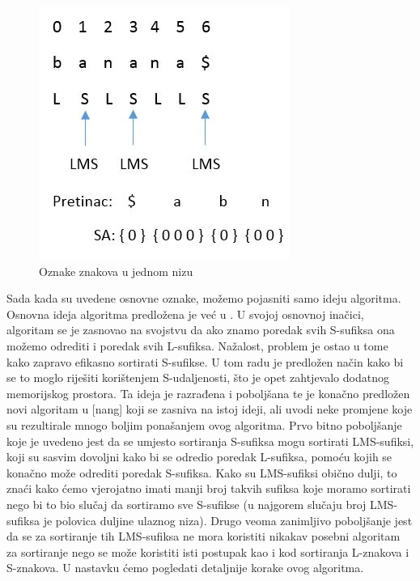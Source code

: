 \begin{figure}[h]
   \centering
       \includegraphics{./pictures/charactertypes.jpg}
 \caption{Oznake znakova u jednom nizu}
 \label{fig:oznake}
\end{figure}

Sada kada su uvedene osnovne oznake, možemo pojasniti samo ideju algoritma. Osnovna ideja algoritma predložena je već u \cite{ka}. U svojoj osnovnoj inačici, algoritam se je zasnovao na svojstvu da ako znamo poredak svih S-sufiksa ona možemo odrediti i poredak svih L-sufiksa. Nažalost, problem je ostao u tome kako zapravo efikasno sortirati S-sufikse. U tom radu je predložen način kako bi se to moglo riješiti korištenjem S-udaljenosti, što je opet zahtjevalo dodatnog memorijskog prostora. Ta ideja je razrađena i poboljšana te je konačno predložen novi algoritam u [nang] koji se zasniva na istoj ideji, ali uvodi neke promjene koje su rezultirale mnogo boljim ponašanjem ovog algoritma. Prvo bitno poboljšanje koje je uvedeno jest da se umjesto sortiranja S-sufiksa mogu sortirati LMS-sufiksi, koji su sasvim dovoljni kako bi se odredio poredak L-sufiksa, pomoću kojih se konačno može odrediti poredak S-sufiksa. Kako su LMS-sufiksi obično dulji, to znaći kako ćemo vjerojatno imati manji broj takvih sufiksa koje moramo sortirati nego bi to bio slučaj da sortiramo sve S-sufikse (u najgorem slučaju broj LMS-sufiksa je polovica duljine ulaznog niza). Drugo veoma zanimljivo poboljšanje jest da se za sortiranje tih LMS-sufiksa ne mora koristiti nikakav posebni algoritam za sortiranje nego se može koristiti isti postupak kao i kod sortiranja L-znakova i S-znakova. U nastavku ćemo pogledati detaljnije korake ovog algoritma. 

